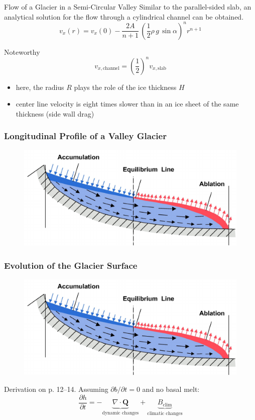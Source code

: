\documentclass[hide notes,intlimits,unknownkeysallowed]{beamer}
\begin{document}
\begin{frame}{Flow of a Glacier in a Semi-Circular Valley}
 Similar to the parallel-sided slab, an analytical solution for the flow through a cylindrical channel can be obtained.
\begin{equation*}
v_x (r) = v_x (0) - \frac{2A}{n+1}\,\left( \frac{1}{2}\rho\,g\,\sin\alpha\right)^{n} r^{n+1}
\end{equation*}
\begin{block}{Noteworthy}
\begin{equation*}
v_{x, \text{channel}} = \left(\frac{1}{2}\right)^{n} v_{x, \text{slab}}
\end{equation*}
\begin{itemize}
\item here, the radius $R$ plays the role of the ice thickness $H$
\item center line velocity is \alert{eight} times slower than in an
  ice sheet of the same thickness (side wall drag)
\end{itemize}
\end{block}
\end{frame}


\begin{frame}
  \frametitle{Longitudinal Profile of a Valley Glacier}
  \begin{figure}
    \includegraphics[width=\textwidth]{flow_acc_abl}
  \end{figure}
\end{frame}

\begin{frame}
  \frametitle{Evolution of the Glacier Surface}
  \begin{figure}
    \includegraphics[width=.75\textwidth]{flow_acc_abl}
  \end{figure}
  Derivation on p. 12--14. Assuming $\partial b / \partial t = 0$ and no basal melt:
  \begin{equation*}
    \frac{\partial h}{\partial t} = - \underbrace{\nabla \cdot \mathbf{Q}}_{\text{dynamic changes}} + \underbrace{B_{\text{clim}}}_{\text{climatic changes}}
  \end{equation*}
\end{frame}
\end{document}
